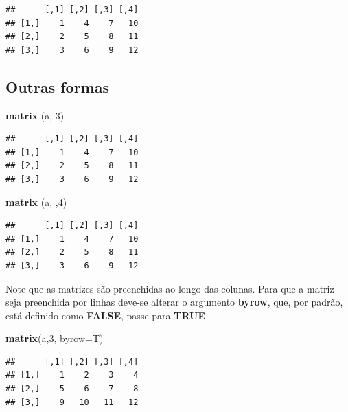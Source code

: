 \documentclass[]{book}
\newenvironment{Shaded}{\begin{snugshade}}{\end{snugshade}}
\newcommand{\DataTypeTok}[1]{\textcolor[rgb]{0.13,0.29,0.53}{#1}}
\newcommand{\DecValTok}[1]{\textcolor[rgb]{0.00,0.00,0.81}{#1}}
\newcommand{\KeywordTok}[1]{\textcolor[rgb]{0.13,0.29,0.53}{\textbf{#1}}}
\newcommand{\NormalTok}[1]{#1}
\begin{document}
\begin{verbatim}
##      [,1] [,2] [,3] [,4]
## [1,]    1    4    7   10
## [2,]    2    5    8   11
## [3,]    3    6    9   12
\end{verbatim}

\hypertarget{outras-formas}{%
\subsection{Outras formas}\label{outras-formas}}

\begin{Shaded}
\begin{Highlighting}[]
\KeywordTok{matrix}\NormalTok{ (a, }\DecValTok{3}\NormalTok{)}
\end{Highlighting}
\end{Shaded}

\begin{verbatim}
##      [,1] [,2] [,3] [,4]
## [1,]    1    4    7   10
## [2,]    2    5    8   11
## [3,]    3    6    9   12
\end{verbatim}

\begin{Shaded}
\begin{Highlighting}[]
\KeywordTok{matrix}\NormalTok{ (a, ,}\DecValTok{4}\NormalTok{)}
\end{Highlighting}
\end{Shaded}

\begin{verbatim}
##      [,1] [,2] [,3] [,4]
## [1,]    1    4    7   10
## [2,]    2    5    8   11
## [3,]    3    6    9   12
\end{verbatim}

Note que as matrizes são preenchidas ao longo das colunas. Para que a matriz seja preenchida por linhas deve-se alterar o argumento \textbf{byrow}, que, por padrão, está definido como \textbf{FALSE}, passe para \textbf{TRUE}

\begin{Shaded}
\begin{Highlighting}[]
\KeywordTok{matrix}\NormalTok{(a,}\DecValTok{3}\NormalTok{, }\DataTypeTok{byrow=}\NormalTok{T)}
\end{Highlighting}
\end{Shaded}

\begin{verbatim}
##      [,1] [,2] [,3] [,4]
## [1,]    1    2    3    4
## [2,]    5    6    7    8
## [3,]    9   10   11   12
\end{verbatim}
\end{document}
